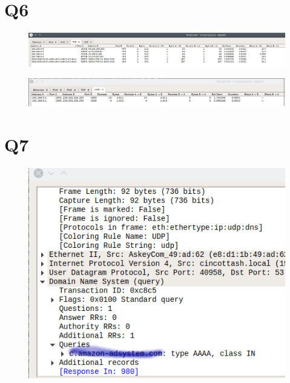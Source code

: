 \documentclass{article}
\begin{document}
\section*{Q6}
\begin{figure}[h!]
\centering
\includegraphics[scale=0.4]{Q6a.png}
\caption{}
\end{figure}

\begin{figure}[h!]
\centering
\includegraphics[scale=0.4]{Q6b.png}
\caption{}
\end{figure}
\clearpage

\section*{Q7}
\begin{figure}[h!]
\centering
\includegraphics[scale=0.4]{Q7a.png}
\caption{}
\end{figure}
\end{document}
